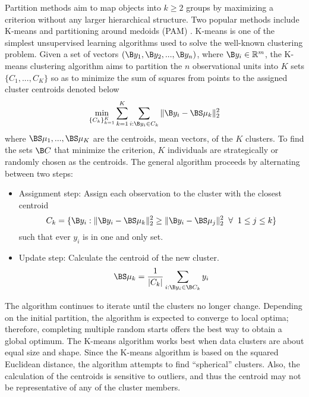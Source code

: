 Partition methods aim to map objects into $k\geq 2$ groups by maximizing a criterion without any larger hierarchical structure. Two popular methods include K-means \cite{macqueen1967} and partitioning around medoids (PAM) \cite{kaufman1990}. K-means is one of the simplest unsupervised learning algorithms used to solve the well-known clustering problem. Given a set of vectors $(\B y_{1},\B y_{2},...,\B y_{n})$, where $\B y_{i}\in\mathbb{R}^{m}$, the K-means clustering algorithm aims to partition the $n$ observational units into $K$ sets $\{C_{1},...,C_{K}\}$ so as to minimize the sum of squares from points to the assigned cluster centroids denoted below
$$\min_{\{C_{k}\}_{k=1}^{K}}\sum_{k=1}^{K}\sum_{i: \B y_{i}\in C_{k}}\|\B y_{i} -\BS \mu_{k}\|_{2}^{2}$$
where $\BS\mu_{1},...,\BS\mu_{K}$ are the centroids, mean vectors, of the $K$ clusters. To find the sets $\B C$ that minimize the criterion, $K$ individuals are strategically or randomly chosen as the centroids. The general algorithm proceeds by alternating between two steps:
\begin{itemize}
\item Assignment step: Assign each observation to the cluster with the closest centroid
$$ C_{k} = \{\B y_{i}: \|\B y_{i} - \BS\mu_{k}\|_{2}^{2}\geq \|\B y_{i} - \BS\mu_{j}\|_{2}^{2} \;\;\forall\;\; 1\leq j\leq k\}$$
such that ever $y_{i}$ is in one and only set.
\item Update step: Calculate the centroid of the new cluster.
$$\BS\mu_{k} = \frac{1}{|C_{k}|}\sum_{i: \B y_{i}\in\B C_{k}} y_{i}$$
\end{itemize}
The algorithm continues to iterate until the clusters no longer change. Depending on the initial partition, the algorithm is expected to converge to local optima; therefore, completing multiple random starts offers the best way to obtain a global optimum. The K-means algorithm works best when data clusters are about equal size and shape. Since the K-means algorithm is based on the squared Euclidean distance, the algorithm attempts to find ``spherical'' clusters. Also, the calculation of the centroids is sensitive to outliers, and thus the centroid may not be representative of any of the cluster members.

